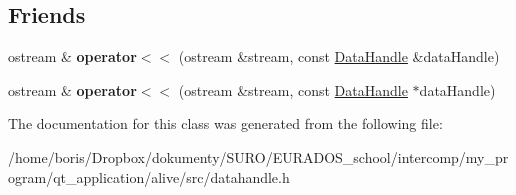\subsection*{Friends}
\begin{DoxyCompactItemize}
\item 
\hypertarget{classDataHandle_a1e7c71a630f82999e0d0899a03a17f2b}{ostream \& {\bfseries operator$<$$<$} (ostream \&stream, const \hyperlink{classDataHandle}{Data\-Handle} \&data\-Handle)}\label{classDataHandle_a1e7c71a630f82999e0d0899a03a17f2b}

\item 
\hypertarget{classDataHandle_a405632c8edc40837fe270361ea4a7d05}{ostream \& {\bfseries operator$<$$<$} (ostream \&stream, const \hyperlink{classDataHandle}{Data\-Handle} $\ast$data\-Handle)}\label{classDataHandle_a405632c8edc40837fe270361ea4a7d05}

\end{DoxyCompactItemize}


The documentation for this class was generated from the following file\-:\begin{DoxyCompactItemize}
\item 
/home/boris/\-Dropbox/dokumenty/\-S\-U\-R\-O/\-E\-U\-R\-A\-D\-O\-S\-\_\-school/intercomp/my\-\_\-program/qt\-\_\-application/alive/src/datahandle.\-h\end{DoxyCompactItemize}
